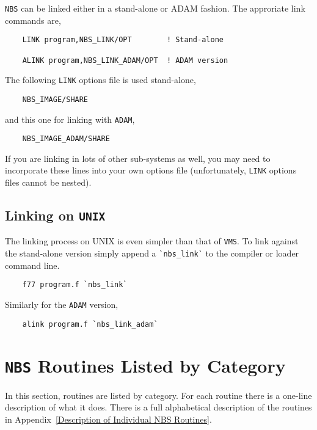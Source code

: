 {\tt NBS} can be linked either in a stand-alone or ADAM fashion. The
approriate link commands are,

\begin {verbatim}
    LINK program,NBS_LINK/OPT        ! Stand-alone

    ALINK program,NBS_LINK_ADAM/OPT  ! ADAM version
\end{verbatim}

The following {\tt LINK} options file is used stand-alone,

\begin {verbatim}
    NBS_IMAGE/SHARE
\end{verbatim}

and this one for linking with {\tt ADAM},

\begin {verbatim}
    NBS_IMAGE_ADAM/SHARE
\end{verbatim}

If you are linking in lots of other sub-systems as well, you may need to
incorporate these lines into your own options file (unfortunately, {\tt LINK}
options files cannot be nested).

\subsection{Linking on {\tt UNIX}}

The linking process on UNIX is even simpler than that of {\tt VMS}. To link 
against the stand-alone version simply append a \verb+`nbs_link`+ to the 
compiler or loader command line.

\begin {verbatim}
    f77 program.f `nbs_link`
\end{verbatim}

Similarly for the {\tt ADAM} version,

\begin {verbatim}
    alink program.f `nbs_link_adam`
\end{verbatim}

\newpage
\section {{\tt NBS} Routines Listed by Category}

In this section, routines are listed by category. For each routine there
is a one-line description of what it does. There is a full alphabetical
description of the routines in Appendix~\ref {Description of Individual
NBS Routines}.

